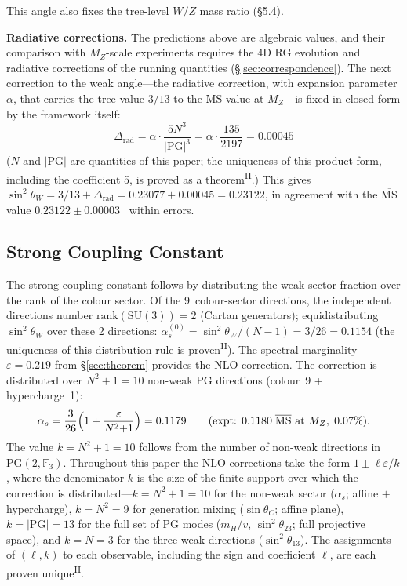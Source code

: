 \documentclass[12pt,a4paper]{article}
\newcommand{\PII}{\textsuperscript{\textup{II}}}
\begin{document}
This angle also fixes the tree-level $W/Z$ mass ratio (\S5.4).

\noindent\textbf{Radiative corrections.}\;
The predictions above are algebraic values, and their comparison with $M_Z$-scale experiments requires the 4D RG evolution and radiative corrections of the running quantities (\S\ref{sec:correspondence}).
The next correction to the weak angle---the radiative correction, with expansion parameter $\alpha$, that carries the tree value $3/13$ to the $\overline{\mathrm{MS}}$ value at $M_Z$---is fixed in closed form by the framework itself:
\[\Delta_\mathrm{rad} = \alpha\cdot\frac{5N^3}{|\mathrm{PG}|^3} = \alpha\cdot\frac{135}{2197} = 0.00045\]
($N$ and $|\mathrm{PG}|$ are quantities of this paper; the uniqueness of this product form, including the coefficient 5, is proved as a theorem\PII{}.) This gives $\sin^2\!\theta_W = 3/13 + \Delta_\mathrm{rad} = 0.23077 + 0.00045 = 0.23122$, in agreement with the $\overline{\mathrm{MS}}$ value $0.23122 \pm 0.00003$~\cite{pdg} within errors.

\subsection{Strong Coupling Constant}\label{sec:strong}

The strong coupling constant follows by distributing the weak-sector
fraction over the rank of the colour sector.
Of the 9~colour-sector directions, the independent directions
number $\mathrm{rank}(\mathrm{SU}(3)) = 2$ (Cartan generators);
equidistributing $\sin^2\!\theta_W$ over
these 2 directions:
$\alpha_s^{(0)} = \sin^2\!\theta_W/(N{-}1) = 3/26 = 0.1154$ (the uniqueness of this distribution rule is proven\PII{}).
The spectral marginality $\varepsilon = 0.219$ from \S\ref{sec:theorem}
provides the NLO correction.
The correction is distributed over $N^2{+}1 = 10$ non-weak
PG directions (colour~9 + hypercharge~1):
\begin{equation}\label{eq:alphas}
  \alpha_s = \frac{3}{26}\Bigl(1 + \frac{\varepsilon}{N^2{+}1}\Bigr) = 0.1179
  \qquad (\text{expt: } 0.1180\;\overline{\mathrm{MS}}\text{ at }M_Z,\; 0.07\%).
\end{equation}
The value $k = N^2{+}1 = 10$ follows from the number of non-weak directions in $\mathrm{PG}(2, \mathbb{F}_3)$. Throughout this paper the NLO corrections take the form
$1 \pm \ell\varepsilon/k$, where the denominator $k$ is the size of the
finite support over which the correction is distributed---$k = N^2{+}1 = 10$
for the non-weak sector ($\alpha_s$; affine $+$ hypercharge),
$k = N^2 = 9$ for generation mixing ($\sin\theta_C$; affine plane),
$k = |\mathrm{PG}| = 13$ for the full set of PG modes ($m_H/v$,
$\sin^2\!\theta_{23}$; full projective space), and $k = N = 3$ for the
three weak directions ($\sin^2\!\theta_{13}$). The assignments of
$(\ell, k)$ to each observable, including the sign and coefficient
$\ell$, are each proven unique\PII{}.
\end{document}
